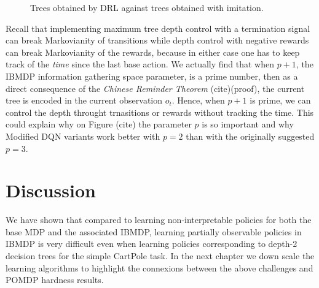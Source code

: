 \begin{figure}[htbp]
    \caption{Trees obtained by DRL against trees obtained with imitation.}
    \label{fig:trees-drl}
\end{figure}

Recall that implementing maximum tree depth control with a termination signal can break Markovianity of transitions while depth control with negative rewards can break Markovianity of the rewards, because in either case one has to keep track of the \textit{time} since the last base action.
We actually find that when $p+1$, the IBMDP information gathering space parameter, is a prime number, then as a direct consequence of the \textit{Chinese Reminder Theorem} (cite)(proof), the current tree is encoded in the current observation $o_t$. 
Hence, when $p+1$ is prime, we can control the depth throught trnasitions or rewards without tracking the time.
This could explain why on Figure (cite) the parameter $p$ is so important and why Modified DQN variants work better with $p=2$ than with the originally suggested $p=3$.


\section{Discussion}
We have shown that compared to learning non-interpretable policies for both the base MDP and the associated IBMDP, learning partially observable policies in IBMDP is very difficult even when learning policies corresponding to depth-2 decision trees for the simple CartPole task.
In the next chapter we down scale the learning algorithms to highlight the connexions between the above challenges and POMDP hardness results.